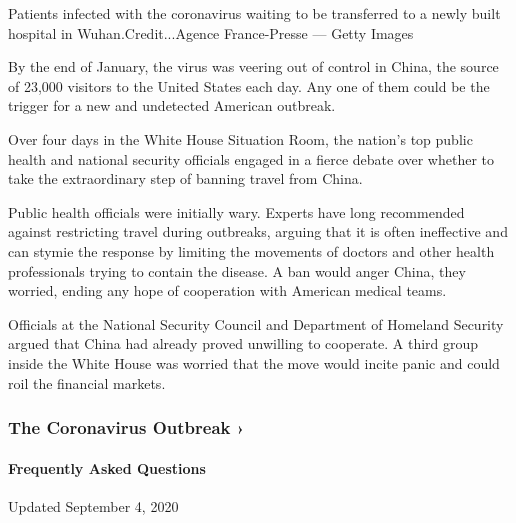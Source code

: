 Patients infected with the coronavirus waiting to be transferred to a
newly built hospital in Wuhan.Credit...Agence France-Presse --- Getty
Images

By the end of January, the virus was veering out of control in China,
the source of 23,000 visitors to the United States each day. Any one of
them could be the trigger for a new and undetected American outbreak.

Over four days in the White House Situation Room, the nation's top
public health and national security officials engaged in a fierce debate
over whether to take the extraordinary step of banning travel from
China.

Public health officials were initially wary. Experts have long
recommended against restricting travel during outbreaks, arguing that it
is often ineffective and can stymie the response by limiting the
movements of doctors and other health professionals trying to contain
the disease. A ban would anger China, they worried, ending any hope of
cooperation with American medical teams.

Officials at the National Security Council and Department of Homeland
Security argued that China had already proved unwilling to cooperate. A
third group inside the White House was worried that the move would
incite panic and could roil the financial markets.

\href{https://www.nytimes3xbfgragh.onion/news-event/coronavirus?action=click\&pgtype=Article\&state=default\&region=MAIN_CONTENT_3\&context=storylines_faq}{}

\hypertarget{the-coronavirus-outbreak-}{%
\subsubsection{The Coronavirus Outbreak
›}\label{the-coronavirus-outbreak-}}

\hypertarget{frequently-asked-questions}{%
\paragraph{Frequently Asked
Questions}\label{frequently-asked-questions}}

Updated September 4, 2020

